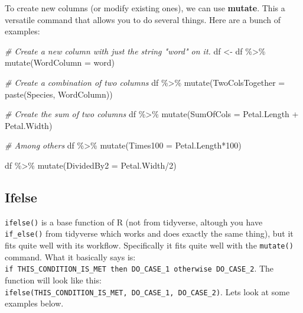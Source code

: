 \documentclass[
]{book}
\newenvironment{Shaded}{\begin{snugshade}}{\end{snugshade}}
\newcommand{\AttributeTok}[1]{\textcolor[rgb]{0.77,0.63,0.00}{#1}}
\newcommand{\CommentTok}[1]{\textcolor[rgb]{0.56,0.35,0.01}{\textit{#1}}}
\newcommand{\DecValTok}[1]{\textcolor[rgb]{0.00,0.00,0.81}{#1}}
\newcommand{\FunctionTok}[1]{\textcolor[rgb]{0.00,0.00,0.00}{#1}}
\newcommand{\NormalTok}[1]{#1}
\newcommand{\OtherTok}[1]{\textcolor[rgb]{0.56,0.35,0.01}{#1}}
\newcommand{\SpecialCharTok}[1]{\textcolor[rgb]{0.00,0.00,0.00}{#1}}
\newcommand{\StringTok}[1]{\textcolor[rgb]{0.31,0.60,0.02}{#1}}
\begin{document}
To create new columns (or modify existing ones), we can use \textbf{mutate}.
This a versatile command that allows you to do several things.
Here are a bunch of examples:

\begin{Shaded}
\begin{Highlighting}[]
\CommentTok{\# Create a new column with just the string "word" on it.}
\NormalTok{df }\OtherTok{\textless{}{-}}\NormalTok{ df }\SpecialCharTok{\%\textgreater{}\%} 
  \FunctionTok{mutate}\NormalTok{(}\AttributeTok{WordColumn =} \StringTok{\textquotesingle{}word\textquotesingle{}}\NormalTok{)}

\CommentTok{\# Create a combination of two columns}
\NormalTok{df }\SpecialCharTok{\%\textgreater{}\%} 
  \FunctionTok{mutate}\NormalTok{(}\AttributeTok{TwoColsTogether =} \FunctionTok{paste}\NormalTok{(Species, WordColumn))}

\CommentTok{\# Create the sum of two columns}
\NormalTok{df }\SpecialCharTok{\%\textgreater{}\%} 
  \FunctionTok{mutate}\NormalTok{(}\AttributeTok{SumOfCols =}\NormalTok{ Petal.Length }\SpecialCharTok{+}\NormalTok{ Petal.Width)}

\CommentTok{\# Among others}
\NormalTok{df }\SpecialCharTok{\%\textgreater{}\%} 
  \FunctionTok{mutate}\NormalTok{(}\AttributeTok{Times100 =}\NormalTok{ Petal.Length}\SpecialCharTok{*}\DecValTok{100}\NormalTok{)}

\NormalTok{df }\SpecialCharTok{\%\textgreater{}\%} 
  \FunctionTok{mutate}\NormalTok{(}\AttributeTok{DividedBy2 =}\NormalTok{ Petal.Width}\SpecialCharTok{/}\DecValTok{2}\NormalTok{)}
\end{Highlighting}
\end{Shaded}

\hypertarget{ifelse}{%
\subsection{Ifelse}\label{ifelse}}

\texttt{ifelse()} is a base function of R (not from tidyverse, altough you have \texttt{if\_else()} from tidyverse which works and does exactly the same thing), but it fits quite well with its workflow.
Specifically it fits quite well with the \texttt{mutate()} command.
What it basically says is: \texttt{if\ THIS\_CONDITION\_IS\_MET\ then\ DO\_CASE\_1\ otherwise\ DO\_CASE\_2}.
The function will look like this: \texttt{ifelse(THIS\_CONDITION\_IS\_MET,\ DO\_CASE\_1,\ DO\_CASE\_2)}.
Lets look at some examples below.
\end{document}
